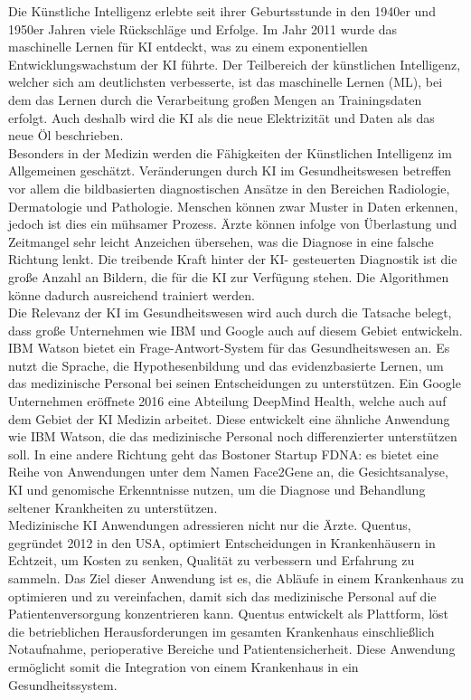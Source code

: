 Die Künstliche Intelligenz erlebte seit ihrer Geburtsstunde in den 1940er und 1950er Jahren viele Rückschläge und Erfolge.\cite{Chapter_14} Im Jahr 2011 wurde das maschinelle Lernen für KI entdeckt, was zu einem exponentiellen Entwicklungswachstum der KI führte.\cite{Chapter_14} Der Teilbereich der künstlichen Intelligenz, welcher sich am deutlichsten verbesserte, ist das maschinelle Lernen (ML), bei dem das Lernen durch die Verarbeitung großen Mengen an Trainingsdaten erfolgt.\cite{The_missing_pieces} Auch deshalb wird die KI als die neue Elektrizität und Daten als das neue Öl beschrieben.\cite{Chapter_14}\\

Besonders in der Medizin werden die Fähigkeiten der Künstlichen Intelligenz im Allgemeinen geschätzt. Veränderungen durch KI im Gesundheitswesen betreffen vor allem die bildbasierten diagnostischen Ansätze in den Bereichen Radiologie, Dermatologie und Pathologie. Menschen können zwar Muster in Daten erkennen, jedoch ist dies ein mühsamer Prozess. Ärzte können infolge von Überlastung und Zeitmangel sehr leicht Anzeichen übersehen, was die Diagnose in eine falsche Richtung lenkt.\cite{Opportunities_challenges_ai_hc} Die treibende Kraft hinter der KI- gesteuerten Diagnostik ist die große Anzahl an Bildern, die für die KI zur Verfügung stehen. Die Algorithmen könne dadurch ausreichend trainiert werden.\cite{The_missing_pieces}\\

Die Relevanz der KI im Gesundheitswesen wird auch durch die Tatsache belegt, dass große Unternehmen wie IBM und Google auch auf diesem Gebiet entwickeln. IBM Watson bietet ein Frage-Antwort-System für das Gesundheitswesen an. Es nutzt die Sprache, die Hypothesenbildung und das evidenzbasierte Lernen, um das medizinische Personal bei seinen Entscheidungen zu unterstützen.\cite{Opportunities_challenges_ai_hc} Ein Google Unternehmen eröffnete 2016 eine Abteilung DeepMind Health, welche auch auf dem Gebiet der KI Medizin arbeitet. Diese entwickelt eine ähnliche Anwendung wie IBM Watson, die das medizinische Personal noch differenzierter unterstützen soll.\cite{Opportunities_challenges_ai_hc} In eine andere Richtung geht das Bostoner Startup FDNA: es bietet eine Reihe von Anwendungen unter dem Namen Face2Gene an, die Gesichtsanalyse, KI und genomische Erkenntnisse nutzen, um die Diagnose und Behandlung seltener Krankheiten zu unterstützen.\cite{Opportunities_challenges_ai_hc}\\

Medizinische KI Anwendungen adressieren nicht nur die Ärzte. Quentus, gegründet 2012 in den USA, optimiert Entscheidungen in Krankenhäusern in Echtzeit, um Kosten zu senken, Qualität zu verbessern und Erfahrung zu sammeln. Das Ziel dieser Anwendung ist es, die Abläufe in einem Krankenhaus zu optimieren und zu vereinfachen, damit sich das medizinische Personal auf die Patientenversorgung konzentrieren kann. Quentus entwickelt als Plattform, löst die betrieblichen Herausforderungen im gesamten Krankenhaus einschließlich Notaufnahme, perioperative Bereiche und Patientensicherheit. Diese Anwendung ermöglicht somit die Integration von einem Krankenhaus in ein Gesundheitssystem.\cite{Opportunities_challenges_ai_hc}\\
 
